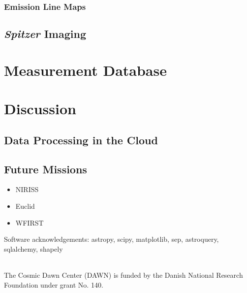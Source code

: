 \documentclass[twocolumn]{aastex63}
\begin{document}
\subsubsection{Emission Line Maps}
\label{s:linemaps}

\subsection{\textit{Spitzer} Imaging}
\label{s:spitzer}

\section{Measurement Database}
\label{s:database}

\section{Discussion}
\label{s:discussion}

\subsection{Data Processing in the Cloud}
\label{s:cloud}

\subsection{Future Missions}
\label{s:future}

\begin{itemize}
    \item NIRISS
    \item Euclid
    \item WFIRST
\end{itemize}


\acknowledgments

Software acknowledgements: astropy, scipy, matplotlib, sep, astroquery, sqlalchemy, shapely

\\ The Cosmic Dawn Center (DAWN) is funded by the Danish National Research Foundation under grant No. 140. 
\end{document}
